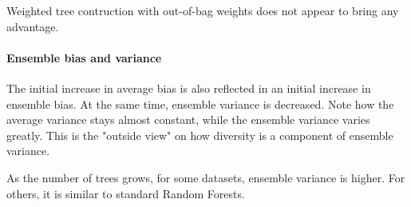 \documentclass[../main.tex]{subfiles}
\begin{document}
Weighted tree contruction with out-of-bag weights does not appear to bring any advantage.




\paragraph{Ensemble bias and variance} 
%
The initial increase in average bias is also reflected in an initial increase in ensemble bias. At the same time, ensemble variance is decreased. 
Note how the average variance stays almost constant, while the ensemble variance varies greatly. 
This is the "outside view" on how diversity is a component of ensemble variance.


As the number of trees grows, for some datasets, ensemble variance is higher. For others, it is similar to standard Random Forests.

\end{document}
